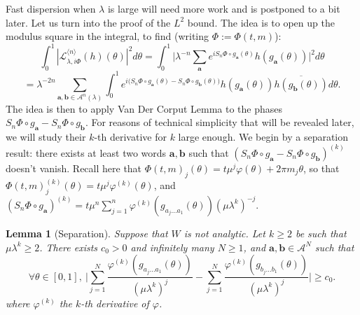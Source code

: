 \documentclass[11pt]{amsart}
\theoremstyle{plain}
\newtheorem{lemma}[theorem]{Lemma}
\theoremstyle{definition}
\numberwithin{equation}{section}
\begin{document}
Fast dispersion when $\lambda$ is large will need more work and is postponed to a bit later. Let us turn into the proof of the $L^2$ bound. The idea is to open up the modulus square in the integral, to find (writing $\Phi := \Phi(t,m)$):
$$ \int_0^1 |\mathcal{L}_{\lambda,i\Phi}^{\langle n \rangle}(h)(\theta)|^2 d\theta = \int_0^1 \Big| \lambda^{-n} \sum_{\mathbf{a}} e^{i S_n \Phi \circ g_{\mathbf{a}}(\theta)} h(g_\mathbf{a}(\theta)) \Big|^2 d\theta  $$ $$ = \lambda^{-2n} \sum_{\mathbf{a},\mathbf{b} \in \mathcal{A}^n(\lambda)} \int_0^1 e^{i \big( S_n \Phi \circ g_\mathbf{a}(\theta) - S_n \Phi \circ g_\mathbf{b}(\theta) \big)} h(g_\mathbf{a}(\theta)) \overline{h(g_\mathbf{b}(\theta))} d\theta. $$
The idea is then to apply Van Der Corput Lemma to the phases $S_n\Phi \circ g_\mathbf{a} - S_n\Phi \circ g_\mathbf{b}$. For reasons of technical simplicity that will be revealed later, we will study their $k$-th derivative for $k$ large enough. 
We begin by a separation result: there exists at least two words $\mathbf{a},\mathbf{b}$ such that $(S_n\Phi \circ g_\mathbf{a} - S_n\Phi \circ g_\mathbf{b})^{(k)}$ doesn't vanish. Recall here that $\Phi(t,m)_j(\theta)=t\mu^j \varphi(\theta)+2\pi m_j \theta$, so that $\Phi(t,m)_j^{(k)}(\theta) = t \mu^{j} \varphi^{(k)}(\theta)$, and $(S_n \Phi \circ g_\mathbf{a})^{(k)} = t \mu^n \sum_{j=1}^{n} { \varphi^{(k)}(g_{a_j \dots a_1}(\theta))}{(\mu \lambda^k)^{-j}}$.

\begin{lemma}[Separation]\label{lem:sepk}
Suppose that $W$ is not analytic. Let $k \geq 2$ be such that $\mu \lambda^k \geq 2$. There exists $c_0>0$ and infinitely many $N \geq 1$, and $\mathbf{a},\mathbf{b} \in \mathcal{A}^N$ such that $$ \forall \theta \in [0,1], \  \Big|\sum_{j=1}^{N} \frac{ \varphi^{(k)}(g_{a_j \dots a_1}(\theta))}{(\mu \lambda^k)^j} - \sum_{j=1}^{N} \frac{ \varphi^{(k)}(g_{b_j \dots b_1}(\theta))}{(\mu \lambda^k)^j}\Big| \geq c_0. $$
where $\varphi^{(k)}$ the $k$-th derivative of $\varphi$.
\end{lemma}
\end{document}
